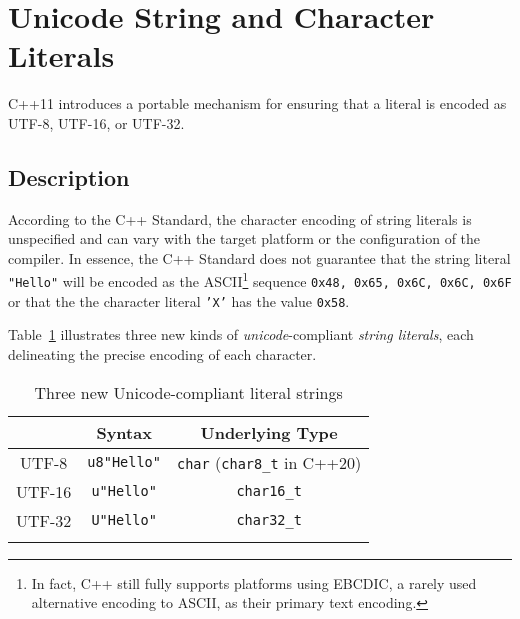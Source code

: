 \newpage
\section[Unicode String and Character Literals]{Unicode String and Character Literals}\label{unicode-string-and-character-literals}

C++11 introduces a portable mechanism for ensuring that a literal is
encoded as UTF-8, UTF-16, or UTF-32.

\subsection[Description]{Description}\label{description-unicodestring}

According to the C++ Standard, the character encoding of string literals
is unspecified and can vary with the target platform or the configuration of
the compiler. In essence, the C++ Standard does not guarantee that the
string literal \texttt{"Hello"} will be encoded as the
ASCII{\cprotect\footnote{In fact, C++ still fully supports platforms
using EBCDIC, a rarely used alternative encoding to ASCII, as their primary text encoding.}} sequence
\texttt{{0x48,} \texttt{0x65,} \texttt{0x6C,} \texttt{0x6C,} \texttt{0x6F}}
or that the the character literal \texttt{'X'} has the value
\texttt{0x58}.

Table~\ref{unicodestring-table1} illustrates three new kinds of \emph{unicode}-compliant
\emph{string literals}, each delineating the precise encoding of each
character.
\begin{table}[h!]
\begin{center}
\begin{threeparttable}
\caption{Three new Unicode-compliant literal strings}\label{unicodestring-table1}\vspace{1.5ex}
{\small \begin{tabular}{c|c|c}\thickhline
\rowcolor[gray]{.9}{\sffamily\bfseries Encoding} & {\sffamily\bfseries Syntax} & {\sffamily\bfseries Underlying Type}\\ \hline
UTF-8   &  \texttt{u8"Hello"} & \texttt{char} (\texttt{char8\_t} in C++20) \\ \hline
UTF-16 & \texttt{u"Hello"}  & \texttt{char16\_t} \\ \hline
UTF-32  & \texttt{U"Hello"} & \texttt{char32\_t}\\ \thickhline
\end{tabular}
} %
\end{threeparttable}
\end{center}
\end{table}

